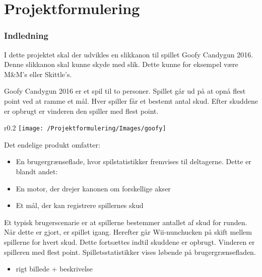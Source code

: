 \frontmatter
\maketitle
\newpage

\tableofcontents
\newpage
\listoffigures
\newpage

\mainmatter
\chapter{Projektformulering}
\subsection{Indledning}
I dette projektet skal der udvikles en slikkanon til spillet Goofy Candygun 2016. Denne slikkanon skal kunne skyde med slik. Dette kunne for eksempel være M\&M’s eller Skittle’s.

Goofy Candygun 2016 er et spil til to personer. Spillet går ud på at opnå flest point ved at ramme et mål. Hver spiller får et bestemt antal skud. Efter skuddene er opbrugt er vinderen den spiller med flest point.
\begin{wrapfigure}{r}{0.2\textwidth}
	\texttt{[image: /Projektformulering/Images/goofy]}
\end{wrapfigure}

Det endelige produkt omfatter:
\begin{itemize}
	\item{En brugergrænseflade, hvor spilstatistikker fremvises til deltagerne. Dette er blandt andet:}
	\item{En motor, der drejer kanonen om forskellige akser}
	\item{Et mål, der kan registrere spillernes skud}
\end{itemize}

Et typisk brugerscenarie er at spillerne bestemmer antallet af skud for runden. Når dette er gjort, er spillet igang. Herefter går Wii-nunchucken på skift mellem spillerne for hvert skud. Dette fortsættes indtil skuddene er opbrugt. Vinderen er spilleren med flest point. Spilletsstatistikker vises løbende på brugergrænsefladen. 

\begin{itemize}
	\item{rigt billede + beskrivelse}
\end{itemize}


